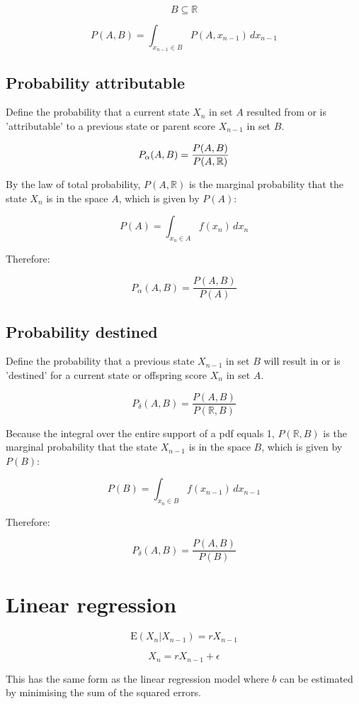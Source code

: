 \documentclass[a4paper,11pt]{article}
\begin{document}
$$B \subseteq \mathbb{R}$$

$$P(A, B) = \int_{x_{n-1}\in B}^{} P(A, x_{n-1}) \, dx_{n-1}$$

\subsection{Probability attributable}
Define the probability that a current state $X_n$ in set $A$ resulted from or is 'attributable' to a previous state or parent score $X_{n-1}$ in set $B$.

$$\large P_{\alpha}(A, B) = \frac{P(A, B)}{P(A, \mathbb{R})}$$

By the law of total probability, $P(A, \mathbb{R})$ is the marginal probability that the state $X_n$ is in the space $A$, which is given by $P(A)$:

$$P(A) = \int_{x_n\in A} f(x_n) \, dx_{n}$$

Therefore:

$$P_{\alpha}(A, B) = \frac{P(A, B)}{P(A)}$$




\subsection{Probability destined}
Define the probability that a previous state $X_{n-1}$ in set $B$ will result in or is 'destined' for a current state or offspring score $X_n$ in set $A$. 

$$P_{\delta}(A, B) = \frac{P(A, B)}{P(\mathbb{R}, B)}$$

Because the integral over the entire support of a pdf equals 1, $P(\mathbb{R}, B)$ is the marginal probability that the state $X_{n-1}$ is in the space $B$, which is given by $P(B)$:

$$P(B) = \int_{x_n\in B} f(x_{n-1}) \, dx_{n-1}$$



Therefore:

$$P_{\delta}(A, B) = \frac{P(A, B)}{P(B)}$$


\section{Linear regression}
$$\mathrm{E}(X_n|X_{n-1}) = rX_{n-1}$$

$$X_n = rX_{n-1} + \epsilon$$





This has the same form as the linear regression model where $b$ can be estimated by minimising the sum of the squared errors.
\end{document}
